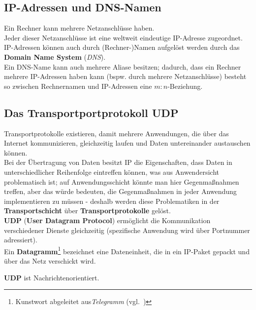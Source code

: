 \subsection{IP-Adressen und DNS-Namen}

Ein Rechner kann mehrere Netzanschlüsse haben.\\

\noindent
Jeder dieser Netzanschlüsse ist eine weltweit eindeutige IP-Adresse zugeordnet.\\

\noindent
IP-Adressen können auch durch (Rechner-)Namen aufgelöst werden durch das \textbf{Domain Name System} (\textit{DNS}).\\

\noindent
Ein DNS-Name kann auch mehrere Aliase besitzen; dadurch, dass ein Rechner mehrere IP-Adressen haben kann (bspw. durch mehrere Netzanschlüsse) besteht so zwischen Rechnernamen und IP-Adressen eine $m:n$-Beziehung.


\subsection{Das Transportportprotokoll UDP}

Transportprotokolle existieren, damit mehrere Anwendungen, die über das Internet kommunizieren, gleichzeitig laufen und Daten untereinander austauschen können.\\

\noindent
Bei der Übertragung von Daten besitzt IP die Eigenschaften, dass Daten in unterschiedlicher Reihenfolge eintreffen können, was aus Anwendersicht problematisch ist; auf Anwendungsschicht könnte man hier Gegenmaßnahmen treffen, aber das würde bedeuten, die Gegenmaßnahmen in jeder Anwendung implementieren zu müssen - deshalb werden diese Problematiken in der \textbf{Transportschicht} über \textbf{Transportprotokolle} gelöst.\\

\noindent
\textbf{UDP} (\textbf{User Datagram Protocol}) ermöglicht die Kommunikation verschiedener Dienste gleichzeitig (spezifische Anwendung wird über Portnummer adressiert).\\

\noindent
Ein \textbf{Datagramm}\footnote{
Kunstwort abgeleitet aus\textit{Telegramm} (vgl.~\cite[260]{Oec22})
} bezeichnet eine Dateneinheit, die in ein IP-Paket gepackt und über das Netz verschickt wird.\\

\begin{tcolorbox}
\textbf{UDP} ist Nachrichtenorientiert.
\end{tcolorbox}

